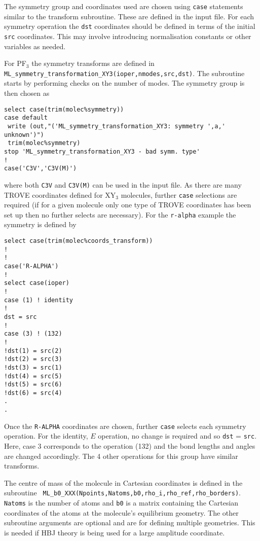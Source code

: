 The symmetry group and coordinates used are chosen using \verb|case| statements similar to the transform subroutine. These
are defined in the input file. For each symmetry operation the \verb|dst| coordinates should be defined in terms of the 
initial \verb|src| coordinates. This may involve introducing normalisation constants or other variables as needed. 

For PF$_3$ the symmetry transforms are defined in \\
\verb|ML_symmetry_transformation_XY3(ioper,nmodes,src,dst)|. The subroutine
starts by performing checks on the number of modes. The symmetry group is then chosen as
\begin{verbatim}
select case(trim(molec%symmetry))
case default
 write (out,"('ML_symmetry_transformation_XY3: symmetry ',a,' unknown')") 
 trim(molec%symmetry)
stop 'ML_symmetry_transformation_XY3 - bad symm. type'
!
case('C3V','C3V(M)')
\end{verbatim}
where both \verb|C3V| and \verb|C3V(M)| can be used in the input file. As there are many TROVE coordinates defined for 
XY$_3$ molecules, further \verb|case| selections are required (if for a given molecule only one type of TROVE coordinates
has been set up then no further selects are necessary). For the \verb|r-alpha| example the symmetry is defined by
\begin{verbatim}
select case(trim(molec%coords_transform))
!
!
case('R-ALPHA')
!
select case(ioper)
!
case (1) ! identity
!
dst = src
!
case (3) ! (132)
!
!dst(1) = src(2)
!dst(2) = src(3)
!dst(3) = src(1)
!dst(4) = src(5)
!dst(5) = src(6)
!dst(6) = src(4)
.
.
\end{verbatim}
Once the \verb|R-ALPHA| coordinates are chosen, further \verb|case| selects each symmetry operation. For the identity, $E$ 
operation, no change is required and so \verb|dst| = \verb|src|. Here, case 3 corresponds to the operation (132) and the
bond lengths and angles are changed accordingly. The 4 other operations for this group have similar transforms. 


The centre of mass of the molecule in Cartesian coordinates is defined in the subroutine 
\verb| ML_b0_XXX(Npoints,Natoms,b0,rho_i,rho_ref,rho_borders)|. \verb|Natoms| is the number of atoms and
\verb|b0| is a matrix containing the Cartesian coordinates of the atoms at the molecule's equilibrium geometry. The 
other subroutine arguments are optional and are for defining multiple geometries. This is needed if HBJ theory
is being used for a large amplitude coordinate. 

